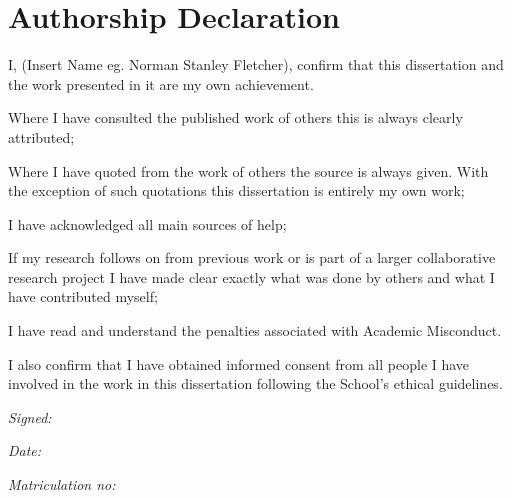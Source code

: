 \section*{Authorship Declaration}
\vspace{0.5cm}
\begin{flushleft}
I, (Insert Name eg. Norman Stanley Fletcher), confirm that this dissertation and the work presented in it are my own achievement.\newline

Where I have consulted the published work of others this is always clearly attributed;\newline

Where I have quoted from the work of others the source is always given. With the exception of such quotations this dissertation is entirely my own work;\newline

I have acknowledged all main sources of help;\newline

If my research follows on from previous work or is part of a larger collaborative research project I have made clear exactly what was done by others and what I have contributed myself;\newline

I have read and understand the penalties associated with Academic Misconduct.\newline

I also confirm that I have obtained informed consent from all people I have involved in the work in this dissertation following the School's ethical guidelines.\newline
\end{flushleft}

\begin{flushleft} \large
\emph{Signed:}\\
\end{flushleft}

\vspace{.5cm}

\begin{flushleft} \large
\emph{Date:}\\
\end{flushleft}

\vspace{.5cm}

\begin{flushleft} \large
\emph{Matriculation no: }\\
\end{flushleft}
